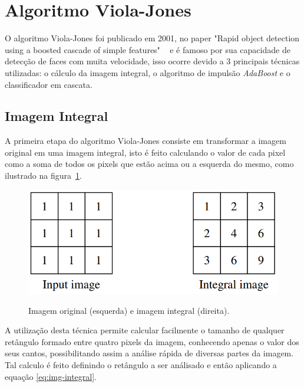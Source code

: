 \section{Algoritmo Viola-Jones}

O algoritmo Viola-Jones foi publicado em 2001, no paper "Rapid object detection using a boosted cascade of simple features" ~\cite{paper-viola-jones} e é famoso por sua capacidade de detecção de faces com muita velocidade, isso ocorre devido a 3 principais técnicas utilizadas: o cálculo da imagem integral, o algoritmo de impulsão \textit{AdaBoost} e o classificador em cascata.

\subsection{Imagem Integral}

A primeira etapa do algoritmo Viola-Jones consiste em transformar a imagem original em uma imagem integral, isto é feito calculando o valor de cada pixel como a soma de todos os pixels que estão acima ou a esquerda do mesmo, como ilustrado na figura~\ref{fig:integral}.

\begin{figure}[htpb]
    \centering
    \caption{Imagem original (esquerda) e imagem integral (direita).}
    \includegraphics[scale=.3]{figs/imagem-integral.png}
    \label{fig:integral}
 \end{figure}

A utilização desta técnica permite calcular facilmente o tamanho de qualquer retângulo formado entre quatro pixels da imagem, conhecendo apenas o valor dos seus cantos, possibilitando assim a análise rápida de diversas partes da imagem. Tal calculo é feito definindo o retângulo a ser análisado e então aplicando a equação \ref{eq:img-integral}.


